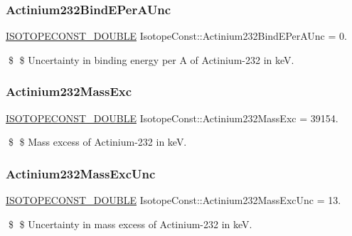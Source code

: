 \subsubsection{\texorpdfstring{Actinium232\+Bind\+E\+Per\+A\+Unc}{Actinium232BindEPerAUnc}}
{\footnotesize\ttfamily \mbox{\hyperlink{group___isotope_const-_macros_ga8f45a7272ce02c0b4c65c44636ed719a}{I\+S\+O\+T\+O\+P\+E\+C\+O\+N\+S\+T\+\_\+\+D\+O\+U\+B\+LE}} Isotope\+Const\+::\+Actinium232\+Bind\+E\+Per\+A\+Unc = 0.}

\$ \$ Uncertainty in binding energy per A of Actinium-\/232 in keV. \mbox{\label{group___isotope_const-_actinium-_ac232_gadf11cafde8e9ca8ed05c50fc2c2a0064}} 
\subsubsection{\texorpdfstring{Actinium232\+Mass\+Exc}{Actinium232MassExc}}
{\footnotesize\ttfamily \mbox{\hyperlink{group___isotope_const-_macros_ga8f45a7272ce02c0b4c65c44636ed719a}{I\+S\+O\+T\+O\+P\+E\+C\+O\+N\+S\+T\+\_\+\+D\+O\+U\+B\+LE}} Isotope\+Const\+::\+Actinium232\+Mass\+Exc = 39154.}

\$ \$ Mass excess of Actinium-\/232 in keV. \mbox{\label{group___isotope_const-_actinium-_ac232_ga0e82d9c42863ff520c71d25b23daa0bd}} 
\subsubsection{\texorpdfstring{Actinium232\+Mass\+Exc\+Unc}{Actinium232MassExcUnc}}
{\footnotesize\ttfamily \mbox{\hyperlink{group___isotope_const-_macros_ga8f45a7272ce02c0b4c65c44636ed719a}{I\+S\+O\+T\+O\+P\+E\+C\+O\+N\+S\+T\+\_\+\+D\+O\+U\+B\+LE}} Isotope\+Const\+::\+Actinium232\+Mass\+Exc\+Unc = 13.}

\$ \$ Uncertainty in mass excess of Actinium-\/232 in keV. \mbox{\label{group___isotope_const-_actinium-_ac232_gae58caf93b00d4e3949612f922e60f106}} 
